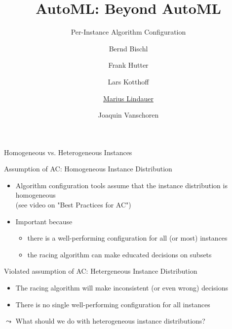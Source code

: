 


\title[AutoML: Capping]{AutoML: Beyond AutoML}
\subtitle{Per-Instance Algorithm Configuration}
\author[Marius Lindauer]{Bernd Bischl \and Frank Hutter \and Lars Kotthoff\newline \and \underline{Marius Lindauer} \and Joaquin Vanschoren}
\institute{}
\date{}





	
	\maketitle
	

\begin{frame}[c]{Homogeneous vs. Heterogeneous Instances}

\begin{block}{Assumption of AC: Homogeneous Instance Distribution}
	\begin{itemize}
		\item Algorithm configuration tools assume that the \alert{instance distribution is homogeneous}\\ (see video on "Best Practices for AC")
		\smallskip
		\item Important because
		\begin{itemize}
			\item there is a well-performing configuration for all (or most) instances
			\item the racing algorithm can make educated decisions on subsets
		\end{itemize}
	\end{itemize}
\end{block}

\medskip
\pause

\begin{block}{Violated assumption of AC: Hetergeneous Instance Distribution}
	\begin{itemize}
		\item The racing algorithm will make inconsistent (or even wrong) decisions 
		\item There is no single well-performing configuration for all instances
	\end{itemize}
\end{block}

\pause
\medskip
$\leadsto$ What should we do with heterogeneous instance distributions?

\end{frame}

